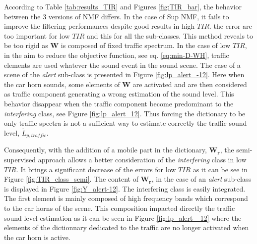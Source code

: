 \documentclass[twocolumn,a4paper,10pt]{article}
\begin{document}
According to Table \ref{tab:results_TIR} and Figures \ref{fig:TIR_bar}, the behavior between the 3 versions of NMF differs. In the case of Sup NMF, it fails to improve the filtering performances despite good results in high $TIR$.  the error are too important for low $TIR$ and this for all the sub-classes. This method reveals to be too rigid as $\mathbf{W}$ is composed of fixed traffic spectrum. In the case of low $TIR$, in the aim to reduce the objective function, see eq. \ref{eq:min-D-WH}, traffic elements are used whatever the sound event in the  sound scene. The case of a scene of the \textit{alert} sub-class is presented in Figure \ref{fig:lp_alert_-12}. Here when the car horn sounds, some elements of $\mathbf{W}$ are activated and are then considered as traffic component generating a wrong estimation of the sound level. This behavior disappear when the traffic component become predominant to the \textit{interfering} class, see Figure \ref{fig:lp_alert_12}. Thus forcing the dictionary to be only traffic spectra is not a sufficient way to estimate correctly the traffic sound level, $\tilde{L}_{p,traffic}$.

Consequently, with the addition of a mobile part in the dictionary, $\mathbf{W_r}$, the semi-supervised approach  allows a better consideration of the \textit{interfering} class in low $TIR$. It brings a significant decrease of the errors for low $TIR$ as it can be see in Figure \ref{fig:TIR_class_semi}. The content of $\mathbf{W_r}$, in the case of an \textit{alert} sub-class is displayed in Figure \ref{fig:Y_alert-12}. The interfering class is easily integrated. The first element is mainly composed of high frequency bands which correspond to the car horns of the scene. This composition impacted directly the traffic sound level estimation as it can be seen in Figure \ref{fig:lp_alert_-12} where the elements of the dictionnary dedicated to the traffic are no longer activated when the car horn is active.
\end{document}
